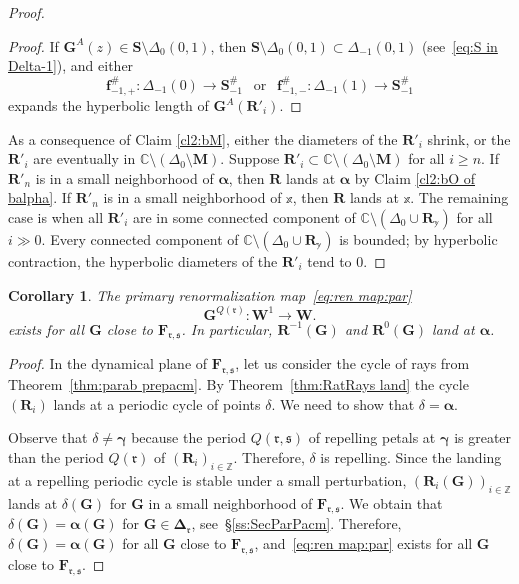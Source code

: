 \documentclass{amsart}
\renewcommand{\sp}{{\ \ }}
\newcommand{\1}{{\mathbb 1 }}
\newcommand\HH{\boldsymbol{\Delta}}%
\newcommand{\bDelta}{{\mathbb{\Delta}}}
\newcommand{\bM}{{\mathbf M}}
\newcommand{\bF}{{\mathbf F}}
\newcommand{\bW}{{\mathbf W}}
\newcommand{\bR}{{\mathbf R}}
\newcommand{\bS}{{\mathbf S}}
\newcommand{\bG}{{\mathbf G}}
\newcommand{\bbf}{{\mathbf f}}
\newcommand{\bxx}{{\mathbb{x}}}
\newcommand{\byy}{{\mathbb{y}}}
\newcommand{\rr}{\mathfrak{r}}
\renewcommand{\ss}{\mathfrak{s}}
\newcommand{\C}{\mathbb{C}}
\newcommand{\Z}{\mathbb{Z}}
\newtheorem{cor}[thm]{Corollary}
\theoremstyle{remark}
\numberwithin{equation}{section}
\theoremstyle{definition}
\newcommand{\balpha}{{\boldsymbol \alpha}}
\newcommand{\bgamma}{{\boldsymbol{ \gamma}}}
\theoremstyle{nonumberbreak}
\begin{document}
\begin{proof}
\begin{proof}
If $\bG^A(z)\in \bS\setminus \Delta_0(0,1)$, then $ \bS\setminus \Delta_0(0,1)\subset \Delta_{-1}(0,1)$ (see~\eqref{eq:S in Delta-1}), and either
\[\bbf^\#_{-1,+}\colon \Delta_{-1}(0)\to \bS_{-1}^\#\sp \text{ or }\sp \bbf^\#_{-1,-}\colon \Delta_{-1}(1)\to \bS^\#_{-1}\] 
expands the hyperbolic length of $\bG^A(\bR'_i)$.
\end{proof}


As a consequence of Claim \ref{cl2:bM}, either the diameters of the $\bR'_i$ shrink, or the $\bR'_i$
 are eventually in $\C\setminus (\bDelta_0\setminus \bM)$. Suppose $\bR'_i\subset \C\setminus (\bDelta_0\setminus \bM)$ for all $i\ge n$. If $\bR'_n$ is in a small neighborhood of $\balpha$, then $\bR$ lands at $\balpha$ by Claim \ref{cl2:bO of balpha}. If $\bR'_n$ is in a small neighborhood of $\bxx$, then $\bR$ lands at $\bxx$. 
 The remaining case is when all $\bR'_i$ are in some connected component of $\C\setminus (\bDelta_0\cup \bR_\byy)$ for all $i\gg 0$. Every connected component of  $\C\setminus (\bDelta_0\cup \bR_\byy)$ is bounded; by hyperbolic contraction, the hyperbolic diameters of the $\bR'_i$ tend to $0$.
\end{proof}

 
\begin{cor}
\label{cor:FRM exists in bVV}
The primary renormalization map~\eqref{eq:ren map:par}
\begin{equation}
\label{eq:FRM:bG}
\bG^{Q(\rr)}\colon \bW^1\to \bW.
\end{equation}
 exists for all $\bG$ close to $\bF_{\rr,\ss}$. In particular, $\bR^{-1}(\bG)$ and $\bR^0(\bG)$ land at $\balpha$.
\end{cor}
\begin{proof}
 In the dynamical plane of $\bF_{\rr,\ss}$, let us consider the cycle of rays from Theorem~\ref{thm:parab prepacm}. By Theorem~\ref{thm:RatRays land} the cycle $(\bR_i)$ lands at a periodic cycle of points $\delta$. We need to show that $\delta=\balpha$. 
 
 Observe that $\delta\not= \bgamma$ because the period $Q(\rr,\ss)$ of repelling petals at $\bgamma$ is greater than the period $Q(\rr)$ of $(\bR_i)_{i\in \Z}$. Therefore, $\delta$ is repelling. Since the landing at a repelling periodic cycle is stable under a small perturbation, $(\bR_i(\bG))_{i\in \Z}$ lands at $\delta(\bG)$ for $\bG$ in a small neighborhood of $\bF_{\rr,\ss}$. We obtain that $\delta(\bG)=\balpha(\bG)$ for $\bG\in \HH_\rr$, see~\S\ref{ss:SecParPacm}. Therefore, $\delta(\bG)=\balpha(\bG)$ for all $\bG$ close to $\bF_{\rr,\ss}$, and~\eqref{eq:ren map:par} exists for all $\bG$ close to $\bF_{\rr,\ss}$.
\end{proof}
\end{document}
